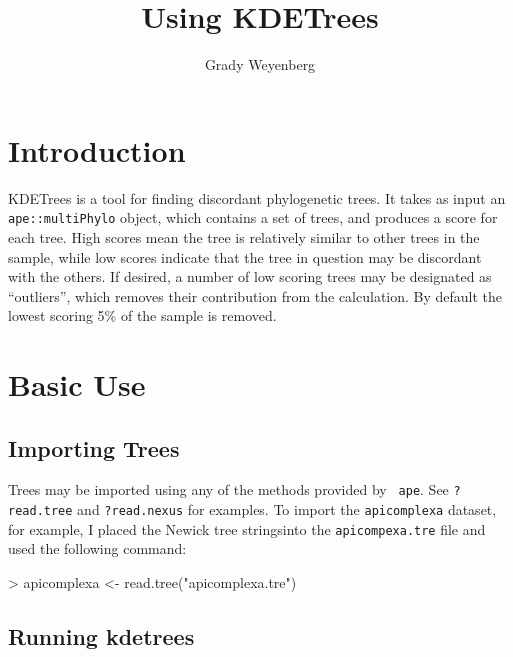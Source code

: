 \documentclass{article}
\title{Using KDETrees}
\author{Grady Weyenberg}
\begin{document}
\maketitle

\section{Introduction}
\label{sec:introduction}

KDETrees is a tool for finding discordant phylogenetic trees. It takes as input an {\tt ape::multiPhylo} object, which contains a set of trees, and produces a score for each tree. High scores mean the tree is relatively similar to other trees in the sample, while low scores indicate that the tree in question may be discordant with the others. If desired, a number of low scoring trees may be designated as ``outliers'', which removes their contribution from the calculation. By default the lowest scoring 5\% of the sample is removed.

\section{Basic Use}
\label{sec:use}

\subsection{Importing Trees}
\label{sec:importing-trees}

Trees may be imported using any of the methods provided by {\tt
  ape}. See {\tt ?read.tree} and {\tt ?read.nexus} for examples. To
import the {\tt apicomplexa} dataset, for example, I placed the Newick
tree stringsinto the {\tt apicompexa.tre} file and used the following command:
\begin{Schunk}
\begin{Sinput}
> apicomplexa <- read.tree("apicomplexa.tre")
\end{Sinput}
\end{Schunk}

\subsection{Running kdetrees}
\label{sec:running-kdetrees}
\end{document}

